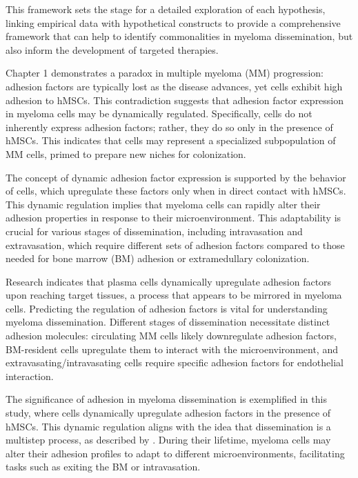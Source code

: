 This framework sets the stage for a detailed exploration of each hypothesis,
linking empirical data with hypothetical constructs to provide a comprehensive
framework that can help to identify commonalities in myeloma dissemination, but
also inform the development of targeted therapies.




\unnsubsection{\caddadaptationtitle}%
\label{sec:discussion_caddadaptation}%


Chapter 1 demonstrates a paradox in multiple myeloma (MM) progression: adhesion
factors are typically lost as the disease advances, yet \INA cells exhibit high
adhesion to \acp{hMSC}. This contradiction suggests that adhesion factor
expression in myeloma cells may be dynamically regulated. Specifically, \INA
cells do not inherently express adhesion factors; rather, they do so only in the
presence of \acp{hMSC}. This indicates that \INA cells may represent a
specialized subpopulation of MM cells, primed to prepare new niches for
colonization.

The concept of dynamic adhesion factor expression is supported by the behavior
of \INA cells, which upregulate these factors only when in direct contact with
\acp{hMSC}. This dynamic regulation implies that myeloma cells can rapidly alter
their adhesion properties in response to their microenvironment. This
adaptability is crucial for various stages of dissemination, including
intravasation and extravasation, which require different sets of adhesion
factors compared to those needed for bone marrow (BM) adhesion or extramedullary
colonization.

Research indicates that plasma cells dynamically upregulate adhesion factors
upon reaching target tissues, a process that appears to be mirrored in myeloma
cells. Predicting the regulation of adhesion factors is vital for understanding
myeloma dissemination. Different stages of dissemination necessitate distinct
adhesion molecules: circulating MM cells likely downregulate adhesion factors,
BM-resident cells upregulate them to interact with the microenvironment, and
extravasating/intravasating cells require specific adhesion factors for
endothelial interaction.

The significance of adhesion in myeloma dissemination is exemplified in this
study, where \INA cells dynamically upregulate adhesion factors in the presence
of \acp{hMSC}. This dynamic regulation aligns with the idea that dissemination
is a multistep process, as described by
\citet{zeissigTumourDisseminationMultiple2020}. During their lifetime, myeloma
cells may alter their adhesion profiles to adapt to different microenvironments,
facilitating tasks such as exiting the BM or intravasation.

